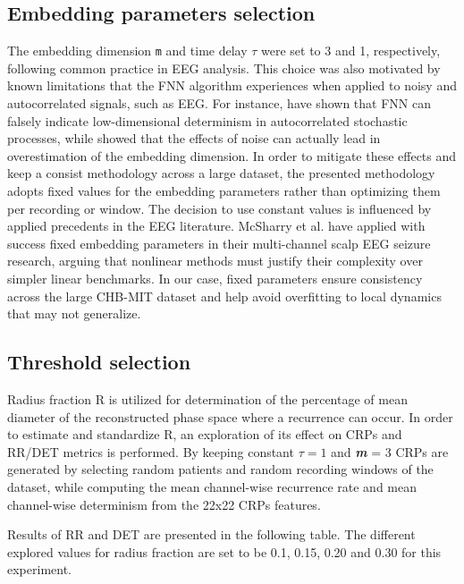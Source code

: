 \documentclass{article}
\begin{document}
				\subsection{Embedding parameters selection}
				\label{subsec:embedding_parameters}
				
				The embedding dimension \texttt{m} and time delay $\tau$ were set to 3 and 1, respectively, 
				following common practice in EEG analysis. This choice was also motivated by known limitations that the FNN algorithm experiences 
				when applied to noisy and autocorrelated signals, such as EEG. 
				For instance, \cite{FredkinRiceFNN} have shown that FNN can falsely indicate low-dimensional determinism in 
				autocorrelated stochastic processes, while \cite{RhodesMorariFNN} showed that the effects of noise can actually
				lead in overestimation of the embedding dimension. 
				In order to mitigate these effects and keep a consist methodology across a 
				large dataset, the presented methodology adopts fixed values for the embedding parameters rather than optimizing them
				per recording or window.
				The decision to use constant values is influenced by applied precedents in the EEG literature. 
				McSharry et al.\cite{mcsharry} have applied with success fixed embedding parameters in their multi-channel scalp EEG seizure research, 
				arguing that nonlinear methods must justify their complexity over simpler linear benchmarks. 
				In our case, fixed parameters ensure consistency across the large CHB-MIT dataset and help avoid overfitting to local dynamics that may not generalize.
				
				\subsection{Threshold selection}
				Radius fraction R is utilized for determination of the percentage of mean diameter of the 
				reconstructed phase space where a recurrence can occur.
				In order to estimate and standardize R,
				an exploration of its effect on CRPs and RR/DET metrics is performed. 
				By keeping constant $\tau = 1$ and \textbf{\textit{m}} = 3
				CRPs are generated by selecting random patients and random recording windows of the dataset,
				while computing the mean channel-wise recurrence rate and mean channel-wise determinism 
				from the 22x22 CRPs features.

				Results of RR and DET are presented in the following table.
				The different explored values for radius fraction are set to be 
				{ 0.1, 0.15, 0.20 and 0.30} for this experiment.
								
\end{document}
